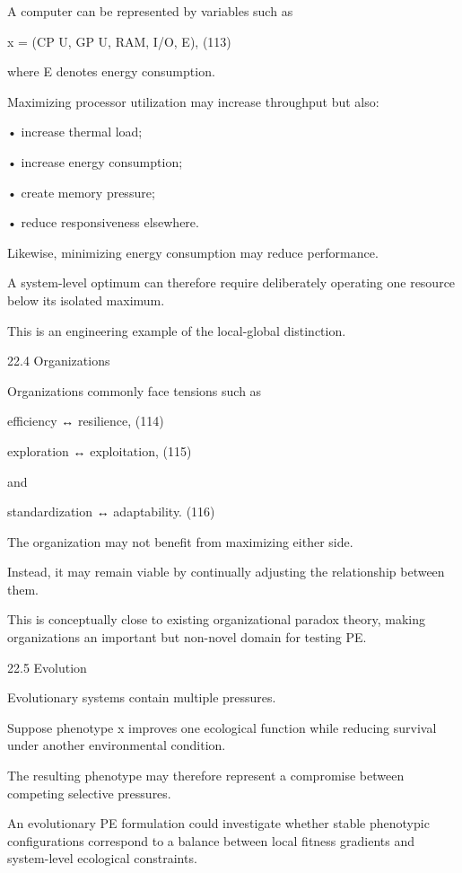 \documentclass[10pt,a4paper]{article}
\begin{document}
\begin{ManuscriptText}
A computer can be represented by variables such as


                               x = (CP U, GP U, RAM, I/O, E),                        (113)

where E denotes energy consumption.

Maximizing processor utilization may increase throughput but also:


  • increase thermal load;

  • increase energy consumption;

  • create memory pressure;

  • reduce responsiveness elsewhere.


Likewise, minimizing energy consumption may reduce performance.

A system-level optimum can therefore require deliberately operating one resource below its
isolated maximum.

This is an engineering example of the local-global distinction.


22.4    Organizations

Organizations commonly face tensions such as


                                     efficiency ↔ resilience,                        (114)


                                  exploration ↔ exploitation,                        (115)

and


                                 standardization ↔ adaptability.                               (116)

The organization may not benefit from maximizing either side.

Instead, it may remain viable by continually adjusting the relationship between them.

This is conceptually close to existing organizational paradox theory, making organizations an
important but non-novel domain for testing PE.


22.5    Evolution

Evolutionary systems contain multiple pressures.

Suppose phenotype x improves one ecological function while reducing survival under another
environmental condition.

The resulting phenotype may therefore represent a compromise between competing selective
pressures.

An evolutionary PE formulation could investigate whether stable phenotypic configurations
correspond to a balance between local fitness gradients and system-level ecological constraints.


\end{ManuscriptText}
\end{document}
